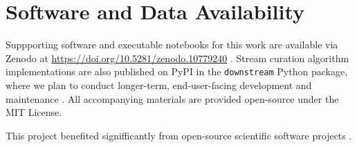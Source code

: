 \section{Software and Data Availability}
\label{sec:materials}

Suppporting software and executable notebooks for this work are available via Zenodo at \url{https://doi.org/10.5281/zenodo.10779240} \citep{moreno2024hsurf}.
Stream curation algorithm implementations are also published on PyPI in the \texttt{downstream} Python package, where we plan to conduct longer-term, end-user-facing development and maintenance \citep{moreno2024downstream}.
All accompanying materials are provided open-source under the MIT License.

This project benefited signifficantly from open-source scientific software projects \citep{2020SciPy-NMeth,harris2020array,reback2020pandas,mckinney-proc-scipy-2010,waskom2021seaborn,hunter2007matplotlib,moreno2023teeplot}.
